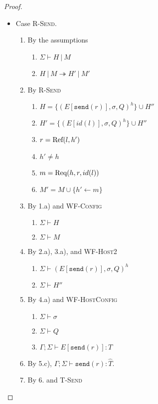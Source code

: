 \begin{proof}
\begin{itemize}
\item Case \textsc{R-Send}.
\begin{enumerate}
\item By the assumptions
  \begin{enumerate}[label=(\alph*)]
  \item $\Sigma \vdash H~|~M$
  \item $H~|~M \twoheadrightarrow H'~|~M'$
  \end{enumerate}
\item By \textsc{R-Send}
  \begin{enumerate}[label=(\alph*)]
  \item $H  = \{ (E[\texttt{send}(r)], \sigma, Q)^h \} \cup H''$
  \item $H' = \{ (E[id(l)], \sigma, Q)^h \} \cup H''$
  \item $r  = {\textrm{Ref}(l, h')}$
  \item $h' \neq h$
  \item $m  = {\textrm{Req}(h, r, id(l))}$
  \item $M' = M \cup \{ h' \leftarrow m \}$
  \end{enumerate}
\item By 1.a) and \textsc{WF-Config}
  \begin{enumerate}[label=(\alph*)]
  \item $\Sigma \vdash H$
  \item $\Sigma \vdash M$
  \end{enumerate}
\item By 2.a), 3.a), and \textsc{WF-Host2}
  \begin{enumerate}[label=(\alph*)]
  \item $\Sigma \vdash (E[\texttt{send}(r)], \sigma, Q)^h$
  \item $\Sigma \vdash H''$
  \end{enumerate}
\item By 4.a) and \textsc{WF-HostConfig}
  \begin{enumerate}[label=(\alph*)]
  \item $\Sigma \vdash \sigma$
  \item $\Sigma \vdash Q$
  \item $\Gamma ; \Sigma \vdash E[\texttt{send}(r)] : T$
  \end{enumerate}
\item By 5.c), $\Gamma ; \Sigma \vdash \texttt{send}(r) : \hat{T}$.
\item By 6. and \textsc{T-Send}
  \begin{enumerate}[label=(\alph*)]

\end{enumerate}
\end{enumerate}
\end{itemize}
\end{proof}

